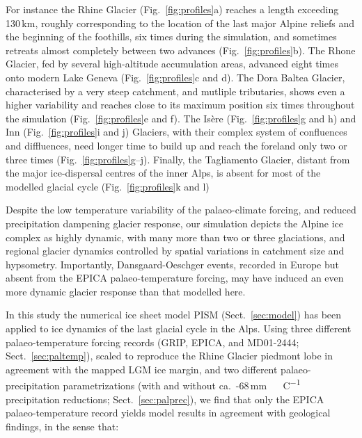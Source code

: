 \documentclass[tc, manuscript]{copernicus}
\begin{document}
    For instance the Rhine Glacier (Fig.~\ref{fig:profiles}a) reaches a length
    exceeding 130\,km, roughly corresponding to the location of the last major
    Alpine reliefs and the beginning of the foothills, six times during the
    simulation, and sometimes retreats almost completely between two advances
    (Fig.~\ref{fig:profiles}b). The Rhone Glacier, fed by several high-altitude
    accumulation areas, advanced eight times onto modern Lake Geneva
    (Fig.~\ref{fig:profiles}c and d). The Dora Baltea Glacier, characterised
    by a very steep catchment, and mutliple tributaries, shows even a higher
    variability and reaches close to its maximum position six times throughout
    the simulation (Fig.~\ref{fig:profiles}e and f). The Isère
    (Fig.~\ref{fig:profiles}g and h) and Inn (Fig.~\ref{fig:profiles}i and j)
    Glaciers, with their complex system of confluences and diffluences, need
    longer time to build up and reach the foreland only two or three times
    (Fig.~\ref{fig:profiles}g--j). Finally, the Tagliamento Glacier, distant
    from the major ice-dispersal centres of the inner Alps, is absent for most
    of the modelled glacial cycle (Fig.~\ref{fig:profiles}k and l)

    Despite the low temperature variability of the palaeo-climate forcing, and
    reduced precipitation dampening glacier response, our simulation depicts
    the Alpine ice complex as highly dynamic, with many more than two or three
    \citep[cf.][]{Preusser.2004,Ivy-Ochs.etal.2008} glaciations, and regional
    glacier dynamics controlled by spatial variations in catchment size and
    hypsometry. Importantly, Dansgaard-Oeschger events, recorded in
    Europe \citep{Spotl.Mangini.2002, Wohlfarth.etal.2008,
    Luetscher.etal.2015} but absent from the EPICA palaeo-temperature forcing,
    may have induced an even more dynamic glacier response than that modelled
    here.


\conclusions

    In this study the numerical ice sheet model PISM (Sect.~\ref{sec:model})
    has been applied to ice dynamics of the last glacial cycle in the Alps.
    Using three different palaeo-temperature forcing records (GRIP, EPICA, and
    MD01-2444; Sect.~\ref{sec:paltemp}), scaled to reproduce the Rhine Glacier
    piedmont lobe in agreement with the mapped LGM ice margin, and two
    different palaeo-precipitation parametrizations (with and without
    ca.~-68\,\unit{mm\,{\degree}C^{-1}}
    precipitation reductions; Sect.~\ref{sec:palprec}), we find that only the
    EPICA palaeo-temperature record yields model results in agreement with
    geological findings, in the sense that:
\end{document}
